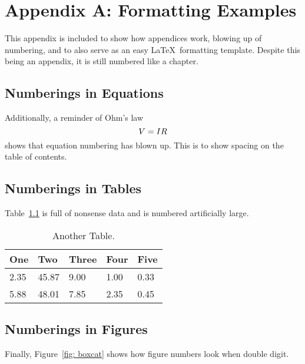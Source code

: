 \chapter{Appendix A: Formatting Examples}

\setcounter{figure}{66}
\setcounter{table}{13}
\setcounter{equation}{41}
This appendix is included to show how appendices work, blowing up of numbering, and to also serve as an easy \LaTeX\ formatting template. Despite this being an appendix, it is still numbered like a chapter.

\section{Numberings in Equations}
Additionally, a reminder of Ohm's law
\begin{equation}{\label{eq:ohms law} }
V = IR
\end{equation} %
\noindent shows that equation numbering has blown up. This is to show spacing on the table of contents.
 
\section{Numberings in Tables}
Table~\ref{tab:exp2} is full of nonsense data and is numbered artificially large.

\begin{table}[!ht]
	\centering
	\begin{tabular}{@{} lllll @{}} 	
		\toprule %
		\footnotesize %
		One& Two  & Three  & Four  & Five  \\
		\midrule		
		2.35& 45.87  & 9.00  & 1.00  &0.33  \\
		5.88& 48.01  & 7.85  & 2.35  & 0.45 \\
		\bottomrule
	\end{tabular}
	\caption{Another Table.}
	\label{tab:exp2}
\end{table}

\section{Numberings in Figures}
Finally, Figure~\ref{fig: boxcat} shows how figure numbers look when double digit.


